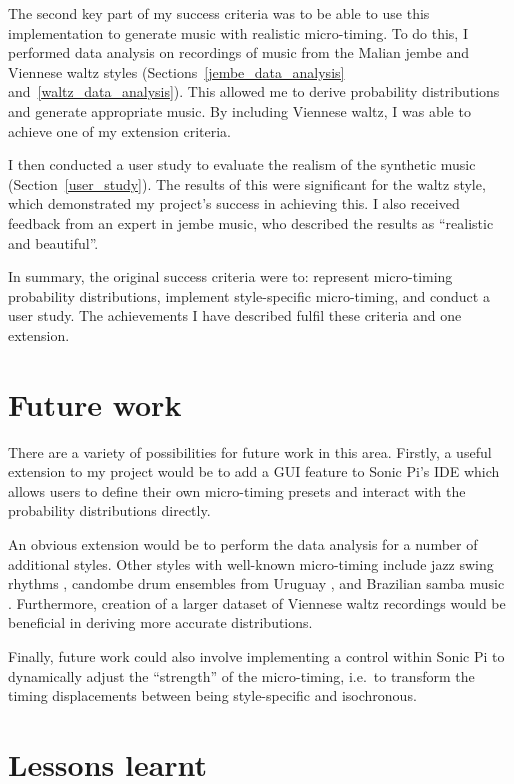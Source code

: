 \documentclass[12pt,twoside,openright]{report}
\begin{document}
The second key part of my success criteria was to be able to use this
implementation to generate music with realistic micro-timing. To do this, I
performed data analysis on recordings of music from the Malian jembe and
Viennese waltz styles (Sections~\ref{jembe_data_analysis} and~\ref{waltz_data_analysis}). This allowed me to derive probability distributions and
generate appropriate music. By including Viennese waltz, I was able to achieve
one of my extension criteria.

I then conducted a user study to evaluate the realism of the synthetic music (Section~\ref{user_study}).
The results of this were significant for the waltz style, which demonstrated my
project's success in achieving this. I also received feedback from an expert in
jembe music, who described the results as ``realistic and beautiful''.

In summary, the original success criteria were to: represent micro-timing probability distributions, implement style-specific micro-timing, and conduct a user study. The achievements I have described fulfil these criteria and one extension.



\section{Future work} \label{future_work}

There are a variety of possibilities for future work in this area. Firstly, a
useful extension to my project would be to add a GUI feature to Sonic Pi's IDE
which allows users to define their own micro-timing presets and interact with
the probability distributions directly.

An obvious extension would be to perform the data analysis for a number of
additional styles. Other styles with well-known micro-timing include jazz swing
rhythms \cite{dittmar2018}, candombe drum ensembles from Uruguay \cite{jure2016,fuentes2019}, and Brazilian samba music \cite{naveda2011,fuentes2019}. Furthermore,
creation of a larger dataset of Viennese waltz recordings would be beneficial in
deriving more accurate distributions.

Finally, future work could also involve implementing a control within Sonic Pi
to dynamically adjust the ``strength'' of the micro-timing, i.e.\ to transform the
timing displacements between being style-specific and isochronous.



\section{Lessons learnt} \label{lessons_learnt}
\end{document}
